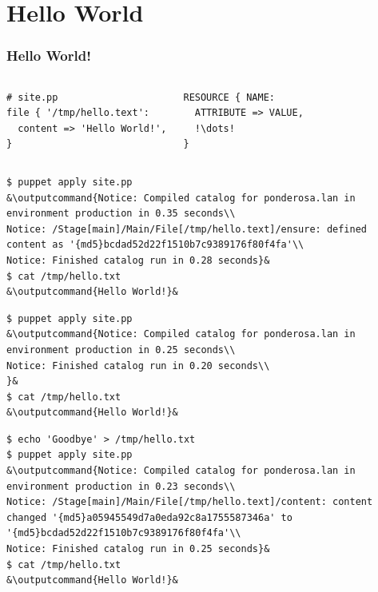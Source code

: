 \documentclass{beamer}
\newcommand{\outputcommand}[1]{\color{darkgreen}{#1}}
\begin{document}
\section{Hello World}
\begin{frame}
\frametitle{Hello World!}
\begin{columns}
\lstset{language=shell}
\begin{lstlisting}[escapechar=&]
# site.pp
file { '/tmp/hello.text':
  content => 'Hello World!',
}
\end{lstlisting}
\lstset{language=shell}
\begin{lstlisting}[escapechar=!]
RESOURCE { NAME:
  ATTRIBUTE => VALUE,
  !\dots!
}
\end{lstlisting}
\end{columns}

\lstset{language=shell}
\begin{lstlisting}[escapechar=&]
$ puppet apply site.pp
&\outputcommand{Notice: Compiled catalog for ponderosa.lan in environment production in 0.35 seconds\\
Notice: /Stage[main]/Main/File[/tmp/hello.text]/ensure: defined content as '{md5}bcdad52d22f1510b7c9389176f80f4fa'\\
Notice: Finished catalog run in 0.28 seconds}&
$ cat /tmp/hello.txt
&\outputcommand{Hello World!}&
\end{lstlisting}

\lstset{language=shell}
\begin{lstlisting}[escapechar=&]
$ puppet apply site.pp
&\outputcommand{Notice: Compiled catalog for ponderosa.lan in environment production in 0.25 seconds\\
Notice: Finished catalog run in 0.20 seconds\\
}&
$ cat /tmp/hello.txt
&\outputcommand{Hello World!}&
\end{lstlisting}

\lstset{language=shell}
\begin{lstlisting}[escapechar=&]
$ echo 'Goodbye' > /tmp/hello.txt
$ puppet apply site.pp
&\outputcommand{Notice: Compiled catalog for ponderosa.lan in environment production in 0.23 seconds\\
Notice: /Stage[main]/Main/File[/tmp/hello.text]/content: content changed '{md5}a05945549d7a0eda92c8a1755587346a' to '{md5}bcdad52d22f1510b7c9389176f80f4fa'\\
Notice: Finished catalog run in 0.25 seconds}&
$ cat /tmp/hello.txt
&\outputcommand{Hello World!}&
\end{lstlisting}

\end{frame}
\end{document}
